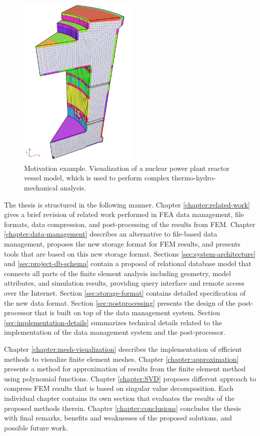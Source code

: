 \begin{figure}[H]
\centering
\includegraphics[width=0.5\textwidth]{figures/chapter-introduction/motivation-example}
\decoRule
\caption[Motivation example -- reactor vessel model visualization.]{Motivation example. Visualization of a nuclear power plant reactor vessel model, which is used to perform complex thermo-hydro-mechanical analysis.}
\label{fig:motivation-example}
\end{figure}

The thesis is structured in the following manner. Chapter \ref{chapter:related-work} gives a brief revision of related work performed in FEA data management, file formats, data compression, and post-processing of the results from FEM. Chapter \ref{chapter:data-management} describes an alternative to file-based data management, proposes the new storage format for FEM results, and presents tools that are based on this new storage format. Sections \ref{sec:system-architecture} and \ref{sec:project-db-schema} contain a proposal of relational database model that connects all parts of the finite element analysis including geometry, model attributes, and simulation results, providing query interface and remote access over the Internet. Section \ref{sec:storage-format} contains detailed specification of the new data format. Section \ref{sec:postprocessing} presents the design of the post-processor that is built on top of the data management system. Section \ref{sec:implementation-details} summarizes technical details related to the implementation of the data management system and the post-processor.

Chapter \ref{chapter:mesh-visualization} describes the implementation of efficient methods to visualize finite element meshes. Chapter \ref{chapter:approximation} presents a method for approximation of results from the finite element method using polynomial functions. Chapter \ref{chapter:SVD} proposes different approach to compress FEM results that is based on singular value decomposition. Each individual chapter contains its own section that evaluates the results of the proposed methods therein. Chapter \ref{chapter:conclusions} concludes the thesis with final remarks, benefits and weaknesses of the proposed solutions, and possible future work.

